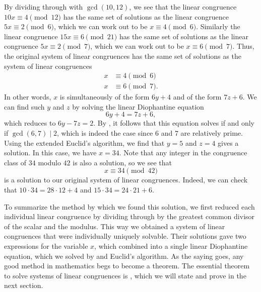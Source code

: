By dividing through with $\gcd(10,12)$, we see that the linear congruence $10x\equiv 4\pmod{12}$ has the same set of solutions as the linear congruence $5x\equiv 2\pmod{6}$, which we can work out to be $x\equiv 4\pmod{6}$. Similarly the linear congruence $15x\equiv 6\pmod{21}$ has the same set of solutions as the linear congruence $5x\equiv 2\pmod{7}$, which we can work out to be $x\equiv 6\pmod{7}$. Thus, the original system of linear congruences has the same set of solutions as the system of linear congruences
\begin{align*}
  x & \equiv 4 \pmod{6} \\
  x & \equiv 6 \pmod{7}.
\end{align*}
In other words, $x$ is simultaneously of the form $6y + 4$ and of the form $7z+6$. We can find such $y$ and $z$ by solving the linear Diophantine equation
\begin{equation*}
  6y+4=7z+6,
\end{equation*}
which reduces to $6y-7z=2$. By , it follows that this equation solves if and only if $\gcd(6,7)\mid 2$, which is indeed the case since $6$ and $7$ are relatively prime. Using the extended Euclid's algorithm, we find that $y=5$ and $z=4$ gives a solution. In this case, we have $x=34$. Note that any integer in the congruence class of $34$ modulo $42$ is also a solution, so we see that
\begin{equation*}
  x\equiv 34\pmod{42}
\end{equation*}
is a solution to our original system of linear congruences. Indeed, we can check that $10\cdot 34 = 28\cdot 12 + 4$ and $15\cdot 34 = 24\cdot 21+6$.

To summarize the method by which we found this solution, we first reduced each individual linear congruence by dividing through by the greatest common divisor of the scalar and the modulus. This way we obtained a system of linear congruences that were individually uniquely solvable. Their solutions gave two expressions for the variable $x$, which combined into a single linear Diophantine equation, which we solved by  and Euclid's algorithm. As the saying goes, any good method in mathematics begs to become a theorem. The essential theorem to solve systems of linear congruences is , which we will state and prove in the next section.

